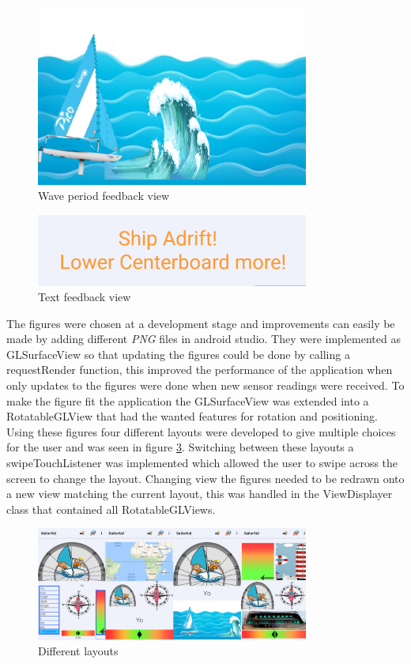 \begin{figure}[H]
\centering
\includegraphics[width=0.8\textwidth]{Figures/wave.png}
\caption{Wave period feedback view}
\label{feedback-wave}
\end{figure}
\begin{figure}[H]
\centering
\includegraphics[width=0.8\textwidth]{Figures/text.png}
\caption{Text feedback view}
\label{feedback-text}
\end{figure}
The figures were chosen at a development stage and improvements can easily be made by adding different \textit{PNG}\cite{png} files in android studio. They were implemented as GLSurfaceView\cite{gl} so that updating the figures could be done by calling a requestRender function, this improved the performance of the application when only updates to the figures were done when new sensor readings were received. To make the figure fit the application the GLSurfaceView was extended into a RotatableGLView that had the wanted features for rotation and positioning. Using these figures four different layouts were developed to give multiple choices for the user and was seen in figure \ref{feedback-layouts}. Switching between these layouts a swipeTouchListener was implemented which allowed the user to swipe across the screen to change the layout. Changing view the figures needed to be redrawn onto a new view matching the current layout, this was handled in the ViewDisplayer class that contained all RotatableGLViews.

\begin{figure}[H]
\centering
\includegraphics[width=0.8\textwidth]{Figures/layouts.png}
\caption{Different layouts}
\label{feedback-layouts}
\end{figure}

